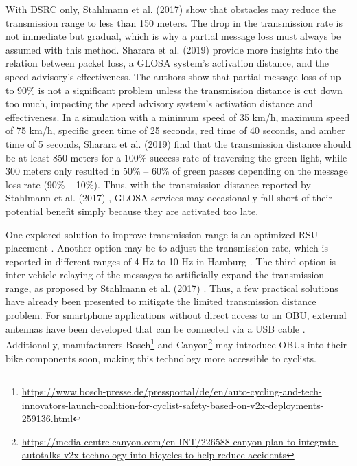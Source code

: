With DSRC only, Stahlmann et al. (2017) \cite{stahlmann_multi-hop_2017} show that obstacles may reduce the transmission range to less than 150 meters. The drop in the transmission rate is not immediate but gradual, which is why a partial message loss must always be assumed with this method. Sharara et al. (2019) \cite{sharara_impact_2019} provide more insights into the relation between packet loss, a GLOSA system's activation distance, and the speed advisory's effectiveness. The authors show that partial message loss of up to 90\% is not a significant problem unless the transmission distance is cut down too much, impacting the speed advisory system's activation distance and effectiveness. In a simulation with a minimum speed of 35 km/h, maximum speed of 75 km/h, specific green time of 25 seconds, red time of 40 seconds, and amber time of 5 seconds, Sharara et al. (2019) \cite{sharara_impact_2019} find that the transmission distance should be at least 850 meters for a 100\% success rate of traversing the green light, while 300 meters only resulted in 50\% -- 60\% of green passes depending on the message loss rate (90\% -- 10\%). Thus, with the transmission distance reported by Stahlmann et al. (2017) \cite{stahlmann_multi-hop_2017}, GLOSA services may occasionally fall short of their potential benefit simply because they are activated too late.

One explored solution to improve transmission range is an optimized RSU placement \cite{mehar_optimized_2015, massobrio_smart_2015, al-ezaly_optimal_2020}. Another option may be to adjust the transmission rate, which is reported in different ranges of 4 Hz \cite{stahlmann_multi-hop_2017} to 10 Hz in Hamburg \cite{stegen_ideas_2021}. The third option is inter-vehicle relaying of the messages to artificially expand the transmission range, as proposed by Stahlmann et al. (2017) \cite{stahlmann_multi-hop_2017}. Thus, a few practical solutions have already been presented to mitigate the limited transmission distance problem. For smartphone applications without direct access to an OBU, external antennas have been developed that can be connected via a USB cable \cite{kim_vulnerable_2017}. Additionally, manufacturers Bosch\footnote{\url{https://www.bosch-presse.de/pressportal/de/en/auto-cycling-and-tech-innovators-launch-coalition-for-cyclist-safety-based-on-v2x-deployments-259136.html}} and Canyon\footnote{\url{https://media-centre.canyon.com/en-INT/226588-canyon-plan-to-integrate-autotalks-v2x-technology-into-bicycles-to-help-reduce-accidents}} may introduce OBUs into their bike components soon, making this technology more accessible to cyclists.

